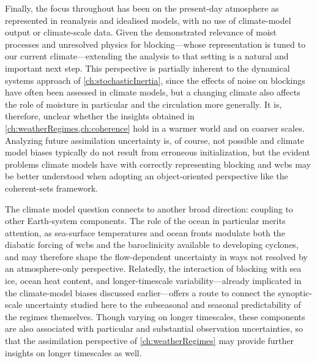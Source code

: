 \medskip

Finally, the focus throughout has been on the present-day atmosphere as
represented in reanalysis and idealised models, with no use of
climate-model output or climate-scale data. Given the demonstrated
relevance of moist processes and unresolved physics for blocking---whose
representation is tuned to our current climate---extending the analysis to that setting is a natural and
important next step. This perspective is partially inherent to the
dynamical systems approach of \cref{ch:stochasticInertia}, since the effects
of noise on blockings have often been assessed in climate models, but
a changing climate also affects the role of moisture in particular and the
circulation more generally. It is, therefore, unclear whether the insights
obtained in \cref{ch:weatherRegimes,ch:coherence} hold in a warmer world
and on coarser scales. Analyzing future assimilation uncertainty is, of
course, not possible and climate model biases typically do not result from
erroneous initialization, but the evident problems climate models have with
correctly representing blocking and \glspl{wcb} may be better understood
when adopting an object-oriented perspective like the coherent-sets
framework.

The climate model question connects to another broad direction: coupling to
other Earth-system components. The role of the ocean in particular merits
attention, as sea-surface temperatures and ocean fronts modulate both the
diabatic forcing of \glspl{wcb} and the baroclinicity available to
developing cyclones, and may therefore shape the flow-dependent uncertainty
in ways not resolved by an atmosphere-only perspective. Relatedly, the
interaction of blocking with sea ice, ocean heat content, and
longer-timescale variability---already implicated in the climate-model
biases discussed earlier---offers a route to connect the synoptic-scale
uncertainty studied here to the subseasonal and seasonal predictability of
the regimes themselves. Though varying on longer timescales, these components
are also associated with particular and substantial observation uncertainties,
so that the assimilation perspective of \cref{ch:weatherRegimes} may provide
further insights on longer timescales as well.

\bigskip


